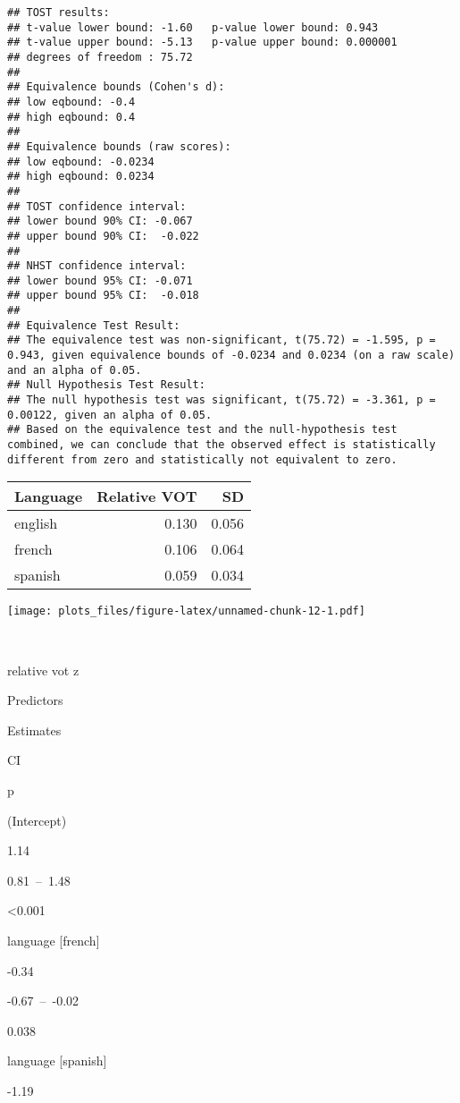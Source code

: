 \documentclass[
]{article}
\begin{document}
\begin{verbatim}
## TOST results:
## t-value lower bound: -1.60   p-value lower bound: 0.943
## t-value upper bound: -5.13   p-value upper bound: 0.000001
## degrees of freedom : 75.72
## 
## Equivalence bounds (Cohen's d):
## low eqbound: -0.4 
## high eqbound: 0.4
## 
## Equivalence bounds (raw scores):
## low eqbound: -0.0234 
## high eqbound: 0.0234
## 
## TOST confidence interval:
## lower bound 90% CI: -0.067
## upper bound 90% CI:  -0.022
## 
## NHST confidence interval:
## lower bound 95% CI: -0.071
## upper bound 95% CI:  -0.018
## 
## Equivalence Test Result:
## The equivalence test was non-significant, t(75.72) = -1.595, p = 0.943, given equivalence bounds of -0.0234 and 0.0234 (on a raw scale) and an alpha of 0.05.
## Null Hypothesis Test Result:
## The null hypothesis test was significant, t(75.72) = -3.361, p = 0.00122, given an alpha of 0.05.
## Based on the equivalence test and the null-hypothesis test combined, we can conclude that the observed effect is statistically different from zero and statistically not equivalent to zero.
\end{verbatim}

\begin{longtable}[]{@{}lrr@{}}
\toprule
Language & Relative VOT & SD \\
\midrule
\endhead
english & 0.130 & 0.056 \\
french & 0.106 & 0.064 \\
spanish & 0.059 & 0.034 \\
\bottomrule
\end{longtable}

\texttt{[image: plots\_files/figure-latex/unnamed-chunk-12-1.pdf]}

~

relative vot z

Predictors

Estimates

CI

p

(Intercept)

1.14

0.81~--~1.48

\textless0.001

language {[}french{]}

-0.34

-0.67~--~-0.02

0.038

language {[}spanish{]}

-1.19
\end{document}

